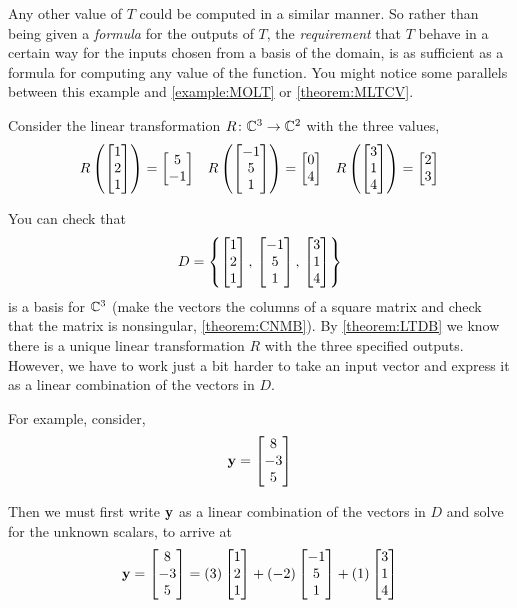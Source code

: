 \documentclass{ximera}
\begin{document}
\begin{example}
Any other value of $T$ could be computed in a similar manner.  So
rather than being given a \textit{formula} for the outputs of $T$, the
\textit{requirement} that $T$ behave in a certain way for the inputs
chosen from a basis of the domain, is as sufficient as a formula for
computing any value of the function.  You might notice some parallels
between this example and \ref{example:MOLT} or \ref{theorem:MLTCV}.

\end{example}

\begin{example}

Consider the linear transformation $R\colon \mathbb{C}^{3}\rightarrow\mathbb{C}^{2}$ with the three values,
\begin{align*}
R\left(\begin{bmatrix}1\\2\\1\end{bmatrix}\right)=\begin{bmatrix}5\\-1\end{bmatrix}&&
R\left(\begin{bmatrix}-1\\5\\1\end{bmatrix}\right)=\begin{bmatrix}0\\4\end{bmatrix}&&
R\left(\begin{bmatrix}3\\1\\4\end{bmatrix}\right)=\begin{bmatrix}2\\3\end{bmatrix}
\end{align*}

You can check that
\[
D=\left\{
\begin{bmatrix}1\\2\\1\end{bmatrix},\,
\begin{bmatrix}-1\\5\\1\end{bmatrix},\,
\begin{bmatrix}3\\1\\4\end{bmatrix}
\right\}
\]
is a basis for $\mathbb{C}^{3}$ (make the vectors the columns of a square matrix and check that the matrix is nonsingular,  \ref{theorem:CNMB}).  By \ref{theorem:LTDB} we know there is a unique linear transformation $R$ with the three specified outputs.  However, we have to work just a bit harder to take an input vector and express it as a linear combination of the vectors in $D$.

For example, consider,
\[
\mathbf{y}=\begin{bmatrix}8\\-3\\5\end{bmatrix}
\]

Then we must first write $\mathbf{y}$ as a linear combination of the vectors in $D$ and solve for the unknown scalars, to arrive at
\[
\mathbf{y}=\begin{bmatrix}8\\-3\\5\end{bmatrix}= (3)\begin{bmatrix}1\\2\\1\end{bmatrix}+ (-2)\begin{bmatrix}-1\\5\\1\end{bmatrix}+ (1)\begin{bmatrix}3\\1\\4\end{bmatrix}
\]


\end{example}
\end{document}
